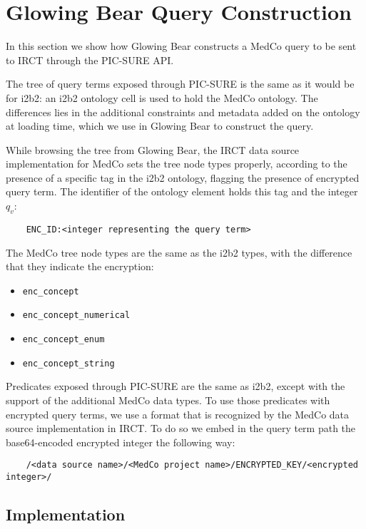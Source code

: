 \section{Glowing Bear Query Construction}

In this section we show how Glowing Bear constructs a MedCo query to be sent to IRCT through the PIC-SURE API.

The tree of query terms exposed through PIC-SURE is the same as it would be for i2b2: an i2b2 ontology cell is used to hold the MedCo ontology. 
The differences lies in the additional constraints and metadata added on the ontology at loading time, which we use in Glowing Bear to construct the query.

While browsing the tree from Glowing Bear, the IRCT data source implementation for MedCo sets the tree node types properly, according to the presence of a specific tag in the i2b2 ontology, flagging the presence of encrypted query term.
The identifier of the ontology element holds this tag and the integer $q_v$:
\begin{verbatim}
    ENC_ID:<integer representing the query term>
\end{verbatim}

The MedCo tree node types are the same as the i2b2 types, with the difference that they indicate the encryption:
\begin{itemize}    
    \setlength\itemsep{0em}

    \item \verb|enc_concept|
    \item \verb|enc_concept_numerical|
    \item \verb|enc_concept_enum|
    \item \verb|enc_concept_string|
\end{itemize}

Predicates exposed through PIC-SURE are the same as i2b2, except with the support of the additional MedCo data types.
To use those predicates with encrypted query terms, we use a format that is recognized by the MedCo data source implementation in IRCT. 
To do so we embed in the query term path the base64-encoded encrypted integer the following way:
\begin{verbatim}
    /<data source name>/<MedCo project name>/ENCRYPTED_KEY/<encrypted integer>/
\end{verbatim}


\subsection*{Implementation}

